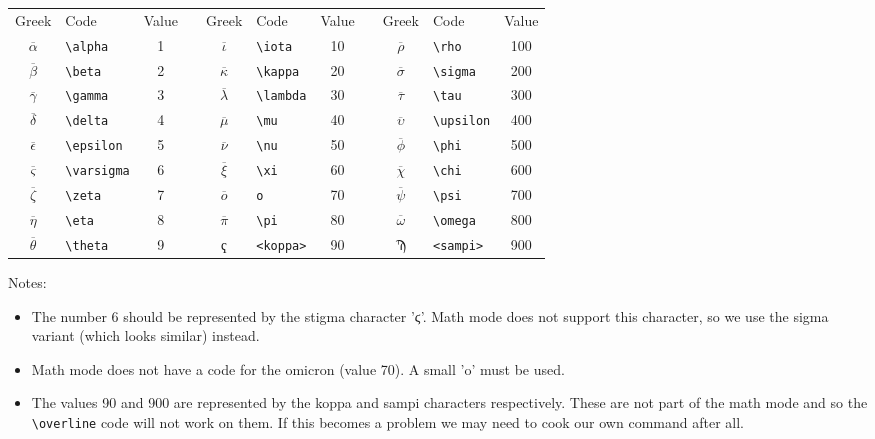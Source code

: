 \documentclass{report}
\begin{document}
\begin{table}[htbp]
\centering
\setlength{\tabcolsep}{5pt}
\renewcommand{\arraystretch}{1.3}
\begin{tabular}{@{} clc c clc c clc @{} }
Greek & Code & Value &&
Greek & Code & Value &&
Greek & Code & Value \\
\cmidrule(r){1-3}\cmidrule(lr){5-7}\cmidrule(l){9-11}
$\overline\alpha$		& \verb+\alpha+		&   1 &&
$\overline\iota$		& \verb+\iota+		&  10 &&
$\overline\rho$			& \verb+\rho+		& 100 \\
$\overline\beta$		& \verb+\beta+		&   2 &&
$\overline\kappa$		& \verb+\kappa+		&  20 &&
$\overline\sigma$		& \verb+\sigma+		& 200 \\
$\overline\gamma$		& \verb+\gamma+		&   3 &&
$\overline\lambda$		& \verb+\lambda+	&  30 &&
$\overline\tau$			& \verb+\tau+		& 300 \\
$\overline\delta$		& \verb+\delta+		&   4 &&
$\overline\mu$			& \verb+\mu+		&  40 &&
$\overline\upsilon$		& \verb+\upsilon+	& 400 \\
$\overline\epsilon$		& \verb+\epsilon+	&   5 &&
$\overline\nu$			& \verb+\nu+		&  50 &&
$\overline\phi$			& \verb+\phi+		& 500 \\
$\overline\varsigma$	& \verb+\varsigma+	&   6 &&
$\overline\xi$			& \verb+\xi+		&  60 &&
$\overline\chi$			& \verb+\chi+		& 600 \\
$\overline\zeta$		& \verb+\zeta+		&   7 &&
$\overline o$			& \verb+o+			&  70 &&
$\overline\psi$			& \verb+\psi+		& 700 \\
$\overline\eta$			& \verb+\eta+		&   8 &&
$\overline\pi$			& \verb+\pi+		&  80 &&
$\overline\omega$		& \verb+\omega+		& 800 \\
$\overline\theta$		& \verb+\theta+		&   9 &&
ҁ						& \verb+<koppa>+	&  90 &&
Ϡ						& \verb+<sampi>+	& 900 \\
\end{tabular}
\end{table}
Notes:
\begin{itemize}
\item The number 6 should be represented by the stigma character 'ϛ'.
Math mode does not support this character, so we use the sigma variant
(which looks similar) instead.
\item Math mode does not have a code for the omicron (value 70).
A small 'o' must be used.
\item The values 90 and 900 are represented by the koppa and sampi characters
respectively. These are not part of the math mode and so the \verb+\overline+
code will not work on them.
If this becomes a problem we may need to cook our own command after all.
\end{itemize}
\end{document}
